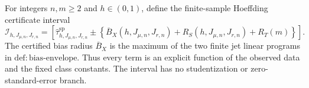 For integers \(n,m\ge2\) and \(h\in(0,1)\), define the finite-sample Hoeffding certificate interval
\[
\mathcal I_{h,J_{\mu,n},J_{r,n}}
=\left[
\widehat\tau^{\mathrm{sp}}_{h,J_{\mu,n},J_{r,n}}
\pm\left\{\overline B_X(h,J_{\mu,n},J_{r,n})+R_S(h,J_{\mu,n},J_{r,n})+R_T(m)\right\}
\right].
\]
The certified bias radius \(\overline B_X\) is the maximum of the two finite jet linear programs in \(\mathrm{def:bias\text{-}envelope}\). Thus every term is an explicit function of the observed data and the fixed class constants. The interval has no studentization or zero-standard-error branch.